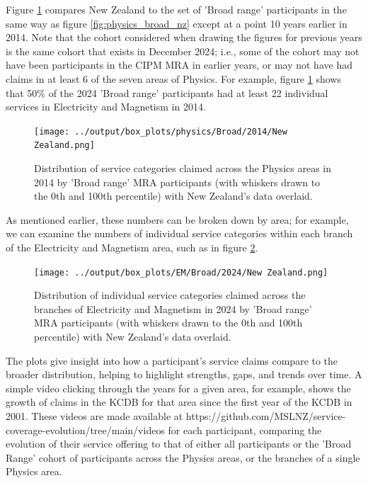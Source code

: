 \documentclass[
	a4paper, %
	10pt, %
	unnumberedsections, %
	twoside, %
]{LTJournalArticle}
\begin{document}
Figure \ref{fig:physics_broad_nz_2014} compares New Zealand to the set of 'Broad range' participants in the same way as figure \ref{fig:physics_broad_nz} except at a point 10 years earlier in 2014. Note that the cohort considered when drawing the figures for previous years is the same cohort that exists in December 2024; i.e., some of the cohort may not have been participants in the CIPM MRA in earlier years, or may not have had claims in at least 6 of the seven areas of Physics. For example, figure \ref{fig:physics_broad_nz_2014} shows that 50\% of the 2024 'Broad range' participants had at least 22 individual services in Electricity and Magnetism in 2014.

\begin{figure}[!htpb]
    \centering
    \texttt{[image: ../output/box\_plots/physics/Broad/2014/New Zealand.png]}
    \caption{Distribution of service categories claimed across the Physics areas in 2014 by 'Broad range' MRA participants (with whiskers drawn to the 0th and 100th percentile) with New Zealand's data overlaid.}
    \label{fig:physics_broad_nz_2014}
\end{figure}

As mentioned earlier, these numbers can be broken down by area; for example, we can examine the numbers of individual service categories within each branch of the Electricity and Magnetism area, such as in figure \ref{fig:EM_broad_nz}.

\begin{figure}[!htpb]
    \centering
    \texttt{[image: ../output/box\_plots/EM/Broad/2024/New Zealand.png]}
    \caption{Distribution of individual service categories claimed across the branches of Electricity and Magnetism in 2024 by 'Broad range' MRA participants (with whiskers drawn to the 0th and 100th percentile) with New Zealand's data overlaid.}
    \label{fig:EM_broad_nz}
\end{figure}

The plots give insight into how a participant’s service claims compare to the broader distribution, helping to highlight strengths, gaps, and trends over time. A simple video clicking through the years for a given area, for example, shows the growth of claims in the KCDB for that area since the first year of the KCDB in 2001. These videos are made available at https://github.com/MSLNZ/service-coverage-evolution/tree/main/videos for each participant, comparing the evolution of their service offering to that of either all participants or the 'Broad Range' cohort of participants across the Physics areas, or the branches of a single Physics area.
\end{document}
